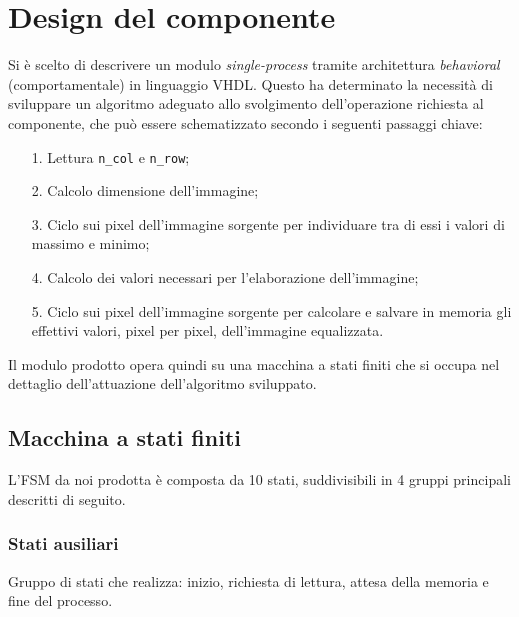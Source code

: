 \documentclass{article}
\begin{document}
\vspace{.6cm}

\section{Design del componente} %
Si è scelto di descrivere un modulo \emph{single-process} tramite architettura \emph{behavioral} (comportamentale) in linguaggio VHDL.
Questo ha determinato la necessità di sviluppare un algoritmo adeguato allo svolgimento dell’operazione richiesta al componente, 
che può essere schematizzato secondo i seguenti passaggi chiave:
\begin{itemize}
    \item   [1.]    Lettura \texttt{n\_col} e \texttt{n\_row};
    \item   [2.]    Calcolo dimensione dell'immagine;
    \item   [3.]    Ciclo sui pixel dell’immagine sorgente per individuare tra di essi i valori di massimo e minimo;
    \item   [4.]    Calcolo dei valori necessari per l’elaborazione dell’immagine;
    \item   [5.]    Ciclo sui pixel dell’immagine sorgente per calcolare e salvare in memoria gli effettivi valori, pixel per pixel, dell’immagine equalizzata.
\end{itemize}

Il modulo prodotto opera quindi su una macchina a stati finiti che si occupa nel dettaglio dell’attuazione dell’algoritmo sviluppato.
\vspace{0,3cm}

\subsection{Macchina a stati finiti} %
L’FSM da noi prodotta è composta da 10 stati, suddivisibili in 4 gruppi principali descritti di seguito.

\subsubsection{Stati ausiliari} %
Gruppo di stati che realizza: inizio, richiesta di lettura, attesa della memoria e fine del processo.
\end{document}

